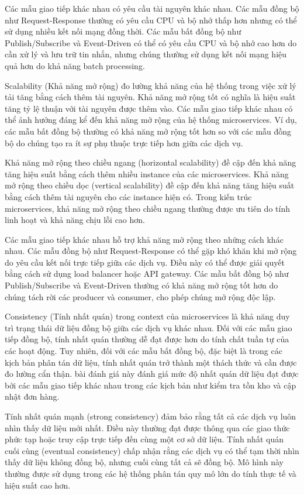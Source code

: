 Các mẫu giao tiếp khác nhau có yêu cầu tài nguyên khác nhau. Các mẫu đồng bộ như Request-Response thường có yêu cầu CPU và bộ nhớ thấp hơn nhưng có thể sử dụng nhiều kết nối mạng đồng thời. Các mẫu bất đồng bộ như Publish/Subscribe và Event-Driven có thể có yêu cầu CPU và bộ nhớ cao hơn do cần xử lý và lưu trữ tin nhắn, nhưng chúng thường sử dụng kết nối mạng hiệu quả hơn do khả năng batch processing.

Scalability (Khả năng mở rộng) đo lường khả năng của hệ thống trong việc xử lý tải tăng bằng cách thêm tài nguyên. Khả năng mở rộng tốt có nghĩa là hiệu suất tăng tỷ lệ thuận với tài nguyên được thêm vào. Các mẫu giao tiếp khác nhau có thể ảnh hưởng đáng kể đến khả năng mở rộng của hệ thống microservices. Ví dụ, các mẫu bất đồng bộ thường có khả năng mở rộng tốt hơn so với các mẫu đồng bộ do chúng tạo ra ít sự phụ thuộc trực tiếp hơn giữa các dịch vụ.

Khả năng mở rộng theo chiều ngang (horizontal scalability) đề cập đến khả năng tăng hiệu suất bằng cách thêm nhiều instance của các microservices. Khả năng mở rộng theo chiều dọc (vertical scalability) đề cập đến khả năng tăng hiệu suất bằng cách thêm tài nguyên cho các instance hiện có. Trong kiến trúc microservices, khả năng mở rộng theo chiều ngang thường được ưu tiên do tính linh hoạt và khả năng chịu lỗi cao hơn.

Các mẫu giao tiếp khác nhau hỗ trợ khả năng mở rộng theo những cách khác nhau. Các mẫu đồng bộ như Request-Response có thể gặp khó khăn khi mở rộng do yêu cầu kết nối trực tiếp giữa các dịch vụ. Điều này có thể được giải quyết bằng cách sử dụng load balancer hoặc API gateway. Các mẫu bất đồng bộ như Publish/Subscribe và Event-Driven thường có khả năng mở rộng tốt hơn do chúng tách rời các producer và consumer, cho phép chúng mở rộng độc lập.

Consistency (Tính nhất quán) trong context của microservices là khả năng duy trì trạng thái dữ liệu đồng bộ giữa các dịch vụ khác nhau. Đối với các mẫu giao tiếp đồng bộ, tính nhất quán thường dễ đạt được hơn do tính chất tuần tự của các hoạt động. Tuy nhiên, đối với các mẫu bất đồng bộ, đặc biệt là trong các kịch bản phân tán dữ liệu, tính nhất quán trở thành một thách thức và cần được đo lường cẩn thận. bài đánh giá này đánh giá mức độ nhất quán dữ liệu đạt được bởi các mẫu giao tiếp khác nhau trong các kịch bản như kiểm tra tồn kho và cập nhật đơn hàng.

Tính nhất quán mạnh (strong consistency) đảm bảo rằng tất cả các dịch vụ luôn nhìn thấy dữ liệu mới nhất. Điều này thường đạt được thông qua các giao thức phức tạp hoặc truy cập trực tiếp đến cùng một cơ sở dữ liệu. Tính nhất quán cuối cùng (eventual consistency) chấp nhận rằng các dịch vụ có thể tạm thời nhìn thấy dữ liệu không đồng bộ, nhưng cuối cùng tất cả sẽ đồng bộ. Mô hình này thường được sử dụng trong các hệ thống phân tán quy mô lớn do tính thực tế và hiệu suất cao hơn.

